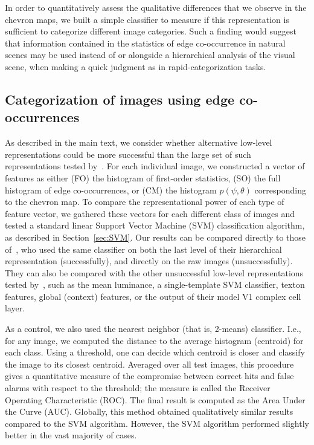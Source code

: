 \documentclass[a4paper]{article}
\begin{document}
In order to quantitatively assess the qualitative differences that we
observe in the chevron maps, we built a simple classifier to measure
if this representation is sufficient to categorize different image
categories.  Such a finding would suggest that information contained
in the statistics of edge co-occurrence in natural scenes may be used
instead of or alongside a hierarchical analysis of the visual scene,
when making a quick judgment as in rapid-categorization tasks.

\subsection{Categorization of images using edge co-occurrences}

As described in the main text, 
we consider whether alternative low-level representations could be more
successful than the large set of such representations tested by~\textcite{Serre07}. 
For each individual image, we constructed a vector of features as either 
(FO) the histogram of first-order statistics, 
(SO) the full histogram of edge co-occurrences, or  
(CM) the histogram $p(\psi, \theta)$ corresponding to the chevron map. 
To compare the representational power of each type of feature vector, 
we gathered these vectors for each different class of images and 
tested a standard linear Support Vector Machine (SVM) classification algorithm, as described in Section~\ref{sec:SVM}. 
Our results can be compared directly to those of~\textcite{Serre07}, 
who used the same classifier on both the last level of their hierarchical representation (successfully), 
and directly on the raw images (unsuccessfully). 
They can also be compared with the other unsuccessful low-level representations 
tested by~\textcite{Serre07}, such as the mean luminance, a single-template SVM classifier, 
texton features, global (context) features, or the output of their model V1 complex cell layer.

As a control, we also used the nearest neighbor (that is, 2-means)
classifier. I.e., for any image, we computed the distance to the
average histogram (centroid) for each class.  Using a threshold, one
can decide which centroid is closer and classify the image to its
closest centroid. Averaged over all test images, this procedure gives
a quantitative measure of the compromise between correct hits and
false alarms with respect to the threshold; the measure is called the
Receiver Operating Characteristic (ROC). The final result is computed
as the Area Under the Curve (AUC). Globally, this method obtained
qualitatively similar results compared to the SVM algorithm. However,
the SVM algorithm performed slightly better in the vast majority of
cases.
\end{document}
